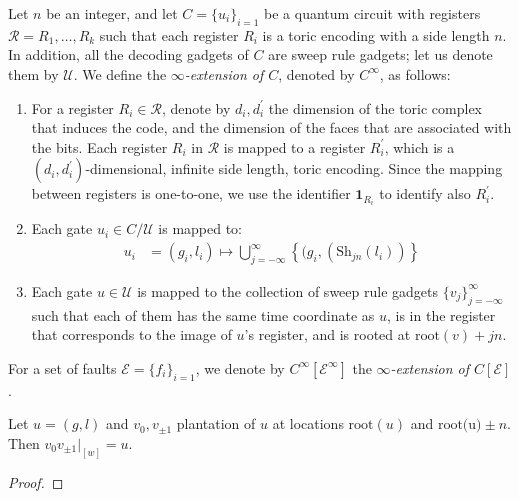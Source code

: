 \begin{definition}
  \label{def:extension}
  Let $n$ be an integer, and let $C = \{u_{i}\}_{i=1}$ be a quantum circuit with registers $\mathcal{R} = R_{1}, \ldots, R_{k}$ such that each register $R_{i}$ is a toric encoding with a side length $n$. In addition, all the decoding gadgets of $C$ are sweep rule gadgets; let us denote them by $\mathcal{U}$. We define the \textit{$\infty$-extension of $C$}, denoted by $C^{\infty}$, as follows:
  \begin{enumerate}
    \item For a register $R_{i} \in \mathcal{R}$, denote by $d_{i}, d_{i}^{\prime}$ the dimension of the toric complex that induces the code, and the dimension of the faces that are associated with the bits. Each register $R_{i}$ in $\mathcal{R}$ is mapped to a register $R^{\prime}_{i}$, which is a $(d_{i}, d_{i}^\prime)$-dimensional, infinite side length, toric encoding. Since the mapping between registers is one-to-one, we use the identifier $\mathbf{1}_{R_{i}}$ to identify also $R^{\prime}_{i}$.
    \item Each gate $u_{i} \in C / \mathcal{U}$ is mapped to:     
      \begin{equation*}
        \begin{split}
          u_{i} & = (g_{i},l_{i}) \mapsto  
          \bigcup_{j = -\infty}^{\infty}\left\{ (g_{i},( \text{Sh}_{jn}(l_{i})) \right\}
        \end{split}
      \end{equation*}
    \item Each gate $ u \in \mathcal{U} $ is mapped to the collection of sweep rule gadgets $\{ v_{j} \}_{j = -\infty}^{\infty}$ such that each of them has the same time coordinate as $ u $, is in the register that corresponds to the image of $ u $'s register, and is rooted at $\text{root}(v) + j n$.
  \end{enumerate}
  For a set of faults $\mathcal{E} = \{ f_{i} \}_{i=1}$, we denote by $C^{\infty}[\mathcal{E}^{\infty}]$ the \textit{$\infty$-extension of $C[\mathcal{E}]$}.
\end{definition}


\begin{claim}
\label{claim:pauli_back}
  Let $ u = (g,l)$ and $v_{0},v_{\pm 1}$ plantation of $u$ at locations $\text{root}(u)$ and $\text{root(u)} \pm n$. Then $v_{0}v_{\pm 1}|_{[w]} = u$.
\end{claim}
\begin{proof}
\end{proof}


